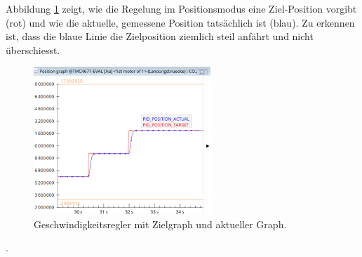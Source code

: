 \newpage

Abbildung \ref{fig:PID_Target} zeigt, wie die Regelung im Positionsmodus eine Ziel-Position vorgibt (rot) und wie die aktuelle, gemessene Position tatsächlich ist (blau). Zu erkennen ist, dass die blaue Linie die Zielposition ziemlich steil anfährt und nicht überschiesst.

\begin{figure}[h!]
	\centering
	\includegraphics[width=0.6\textwidth]{graphics/PID_Target.png}
	\caption{Geschwindigkeitsregler mit Zielgraph und aktueller Graph. \cite{usb_von_herr_schleuniger_foc-motorenansteuerung_2019}}
	\label{fig:PID_Target}
\end{figure}



.








